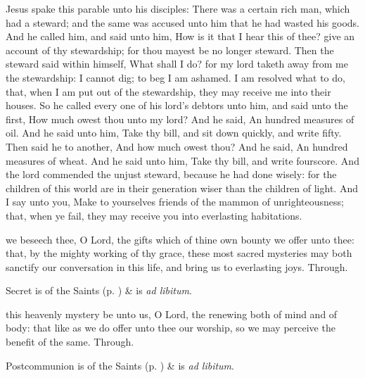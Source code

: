  Jesus spake this parable unto his disciples: There was a certain rich man, which had a steward; and the same was accused unto him that he had wasted his goods. And he called him, and said unto him, How is it that I hear this of thee? give an account of thy stewardship; for thou mayest be no longer steward. Then the steward said within himself, What shall I do? for my lord taketh away from me the stewardship: I cannot dig; to beg I am ashamed. I am resolved what to do, that, when I am put out of the stewardship, they may receive me into their houses. So he called every one of his lord's debtors unto him, and said unto the first, How much owest thou unto my lord? And he said, An hundred measures of oil. And he said unto him, Take thy bill, and sit down quickly, and write fifty. Then said he to another, And how much owest thou? And he said, An hundred measures of wheat. And he said unto him, Take thy bill, and write fourscore. And the lord commended the unjust steward, because he had done wisely: for the children of this world are in their generation wiser than the children of light. And I say unto you, Make to yourselves friends of the mammon of unrighteousness; that, when ye fail, they may receive you into everlasting habitations.


\secret
{} we beseech thee, O Lord, the gifts which of thine own bounty we offer unto thee: that, by the mighty working of thy grace, these most sacred mysteries may both sanctify our conversation in this life, and bring us to everlasting joys. Through.
\begin{rubric}
     Secret is of the Saints (p. \pageref{SPSaints}) \&  is \emph{ad libitum}.
\end{rubric}


\postcommunion
{} this heavenly mystery be unto us, O Lord, the renewing both of mind and of body: that like as we do offer unto thee our worship, so we may perceive the benefit of the same. Through.
\begin{rubric}
     Postcommunion is of the Saints (p. \pageref{SPSaints}) \&  is \emph{ad libitum}.
\end{rubric}


